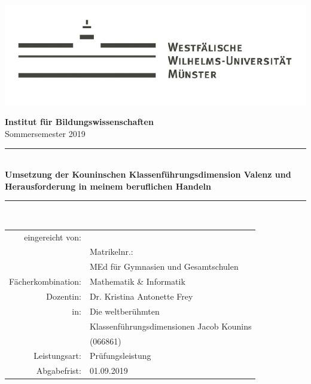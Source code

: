 \documentclass[a4paper,12pt]{scrartcl}
\newcommand{\gr}{\grqq{}}
\newcommand{\gl}{\glqq}
\begin{document}
	
	
\begin{singlespace}
\begin{titlepage}
	\begin{center}
		
		\includegraphics[scale=0.6]{wwu}
		
		\large{\textbf{\textsf{Institut für Bildungswissenschaften}}\\ 
			Sommersemester 2019} \\
		\vspace{20mm}
        \rule{.8\linewidth}{1pt}\\
        \vspace{3mm}
		\LARGE\textbf{\textsf{Umsetzung der Kouninschen Klassenführungsdimension \gl Valenz und Herausforderung\gr{} in meinem beruflichen Handeln}}\\
		\rule{.8\linewidth}{1pt}\\

		\vfill
	\end{center}
\begin{flushright}
	\flushright

		\begin{large}
	\singlespacing 		
		\begin{tabular}{rl}

			eingereicht von: & \\
			 & Matrikelnr.: \\
			 & MEd für Gymnasien und Gesamtschulen\\
			 Fächerkombination: & Mathematik \& Informatik\\
			 \midrule
			Dozentin: & Dr. Kristina Antonette Frey   \\
			in:& Die weltberühmten  \\
			 & Klassenführungsdimensionen Jacob Kounins\\
			 & (066861)\\
			Leistungsart: & Prüfungsleistung\\
			Abgabefrist: & 01.09.2019


\end{tabular}
\end{large}
\end{flushright}
\end{titlepage}
\end{singlespace}
\end{document}
